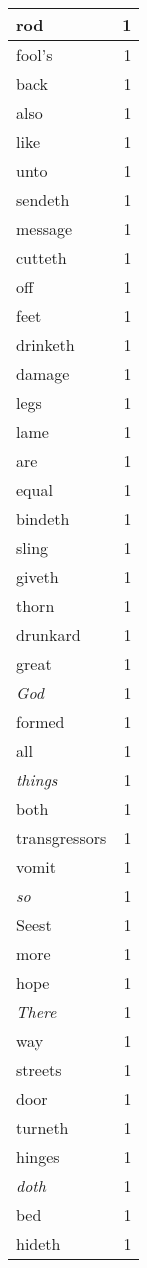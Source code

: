 \begin{center}
\begin{longtable}{l|r}
rod & 1\\ \hline 
fool's & 1\\ \hline 
back & 1\\ \hline 
also & 1\\ \hline 
like & 1\\ \hline 
unto & 1\\ \hline 
sendeth & 1\\ \hline 
message & 1\\ \hline 
cutteth & 1\\ \hline 
off & 1\\ \hline 
feet & 1\\ \hline 
drinketh & 1\\ \hline 
damage & 1\\ \hline 
legs & 1\\ \hline 
lame & 1\\ \hline 
are & 1\\ \hline 
equal & 1\\ \hline 
bindeth & 1\\ \hline 
sling & 1\\ \hline 
giveth & 1\\ \hline 
thorn & 1\\ \hline 
drunkard & 1\\ \hline 
great & 1\\ \hline 
\emph{God} & 1\\ \hline 
formed & 1\\ \hline 
all & 1\\ \hline 
\emph{things} & 1\\ \hline 
both & 1\\ \hline 
transgressors & 1\\ \hline 
vomit & 1\\ \hline 
\emph{so} & 1\\ \hline 
Seest & 1\\ \hline 
more & 1\\ \hline 
hope & 1\\ \hline 
\emph{There} & 1\\ \hline 
way & 1\\ \hline 
streets & 1\\ \hline 
door & 1\\ \hline 
turneth & 1\\ \hline 
hinges & 1\\ \hline 
\emph{doth} & 1\\ \hline 
bed & 1\\ \hline 
hideth & 1\\ \hline 

\end{longtable}
\end{center}
